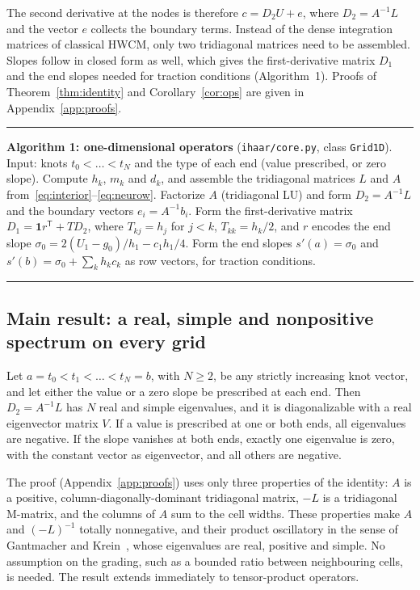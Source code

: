 The second derivative at the nodes is therefore $c=D_2U+e$, where $D_2=A^{-1}L$ and the vector $e$ collects the boundary terms.
Instead of the dense integration matrices of classical HWCM, only two tridiagonal matrices need to be
assembled. Slopes follow in closed form as well, which gives the first-derivative matrix $D_1$ and the
end slopes needed for traction conditions (Algorithm~1). Proofs of Theorem~\ref{thm:identity} and
Corollary~\ref{cor:ops} are given in Appendix~\ref{app:proofs}.

\begin{algorithm}[t]\small\hrule\smallskip
\noindent\textbf{Algorithm 1: one-dimensional operators} (\texttt{ihaar/core.py}, class \texttt{Grid1D}).
Input: knots $t_0<\dots<t_N$ and the type of each end (value prescribed, or zero slope).
 Compute $h_k$, $m_k$ and $d_k$, and assemble the tridiagonal matrices $L$ and $A$ from~\eqref{eq:interior}--\eqref{eq:neurow}.
 Factorize $A$ (tridiagonal LU) and form $D_2=A^{-1}L$ and the boundary vectors $e_i=A^{-1}b_i$.
 Form the first-derivative matrix $D_1=\mathbf 1r^{\mathsf T}+TD_2$, where $T_{kj}=h_j$ for $j<k$, $T_{kk}=h_k/2$, and $r$ encodes the end slope $\sigma_0=2(U_1-g_0)/h_1-c_1h_1/4$.
 Form the end slopes $s'(a)=\sigma_0$ and $s'(b)=\sigma_0+\sum_kh_kc_k$ as row vectors, for traction conditions.
\smallskip\hrule
\end{algorithm}

\subsection{Main result: a real, simple and nonpositive spectrum on every grid}
\begin{theorem}\label{thm:spectrum}
Let $a=t_0<t_1<\dots<t_N=b$, with $N\ge2$, be any strictly increasing knot vector, and let either the
value or a zero slope be prescribed at each end. Then $D_2=A^{-1}L$ has $N$ real and simple eigenvalues,
and it is diagonalizable with a real eigenvector matrix $V$. If a value is prescribed at one or both ends,
all eigenvalues are negative. If the slope vanishes at both ends, exactly one eigenvalue is zero, with the
constant vector as eigenvector, and all others are negative.
\end{theorem}

The proof (Appendix~\ref{app:proofs}) uses only three properties of the identity: $A$ is a positive,
column-diagonally-dominant tridiagonal matrix, $-L$ is a tridiagonal M-matrix, and the columns of $A$ sum
to the cell widths. These properties make $A$ and $(-L)^{-1}$ totally nonnegative, and their product
oscillatory in the sense of Gantmacher and Krein~\cite{gantmacher2002oscillation}, whose eigenvalues are
real, positive and simple. No assumption on the grading, such as a bounded ratio between neighbouring
cells, is needed. The result extends immediately to tensor-product operators.

